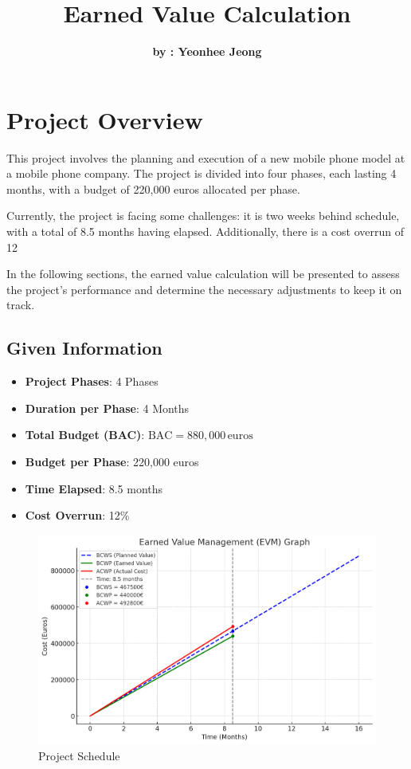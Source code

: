 \documentclass[12pt]{article} %
\begin{document}
\title{\textbf{Earned Value Calculation}}
\author{{\textbf{by : Yeonhee Jeong}}}
\date{} %
\maketitle

\section*{Project Overview}
This project involves the planning and execution of a new mobile phone model at a mobile phone company. The project is divided into four phases, each lasting 4 months, with a budget of 220,000 euros allocated per phase.

Currently, the project is facing some challenges: it is two weeks behind schedule, with a total of 8.5 months having elapsed. Additionally, there is a cost overrun of 12%

In the following sections, the earned value calculation will be presented to assess the project's performance and determine the necessary adjustments to keep it on track.

\subsection*{Given Information}
\begin{itemize}
    \item \textbf{Project Phases}: 4 Phases
    \item \textbf{Duration per Phase}: 4 Months
    \item \textbf{Total Budget (BAC)}: \(\text{BAC} = 880,000 \, \text{euros}\)
    \item \textbf{Budget per Phase}: 220,000 euros
    \item \textbf{Time Elapsed}: 8.5 months
    \item \textbf{Cost Overrun}: 12\%
\end{itemize}

\begin{figure}[htbp] 
    \centering
    \includegraphics[width=0.9\linewidth]{image.png} %
    \caption{Project Schedule} %
    \label{fig:schedule} %
\end{figure}
\end{document}
